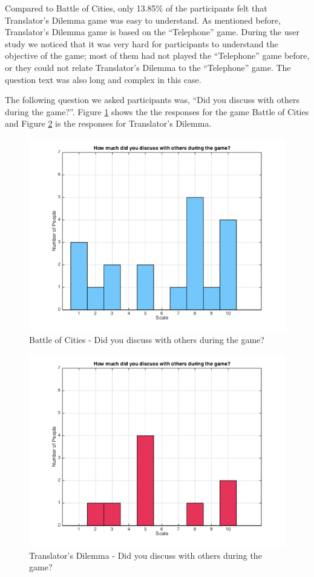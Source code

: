 \documentclass{sig-alternate}
\begin{document}
Compared to Battle of Cities, only 13.85\% of the participants felt that Translator's Dilemma game was easy to understand. As mentioned before, Translator's Dilemma game is based on the ``Telephone'' game. During the user study we noticed that it was very hard for participants to understand the objective of the game; most of them had not played the ``Telephone'' game before, or they could not relate Translator's Dilemma to the ``Telephone'' game. The question text was also long and complex in this case.

The following question we asked participants was, ``Did you discuss with others during the game?''. Figure \ref{fig:p_discuss} shows the the responses for the game Battle of Cities and Figure \ref{fig:t_discuss} is the responses for Translator's Dilemma.

\begin{figure}
	\includegraphics[width=\linewidth]{p_discuss.png}
	\caption{Battle of Cities - Did you discuss with others during the game?}
	\label{fig:p_discuss}
\end{figure}

\begin{figure}
	\includegraphics[width=\linewidth]{t_discuss.png}
	\caption{Translator's Dilemma - Did you discuss with others during the game?}
	\label{fig:t_discuss}
\end{figure}
\end{document}
